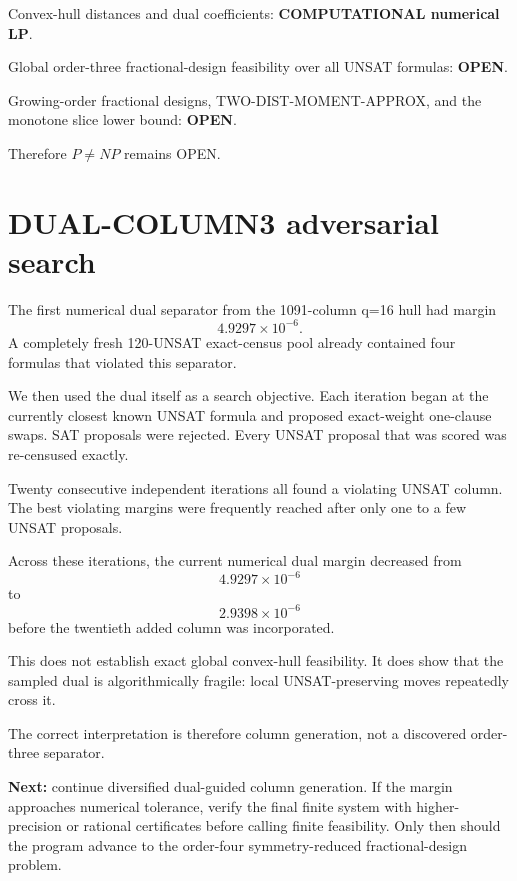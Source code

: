 \documentclass[11pt]{article}
\begin{document}
Convex-hull distances and dual coefficients: \textbf{COMPUTATIONAL numerical
LP}.

Global order-three fractional-design feasibility over all UNSAT formulas:
\textbf{OPEN}.

Growing-order fractional designs, TWO-DIST-MOMENT-APPROX, and the monotone
slice lower bound: \textbf{OPEN}.

Therefore \(P\ne NP\) remains OPEN.


\section{DUAL-COLUMN3 adversarial search}

The first numerical dual separator from the 1091-column q=16 hull had margin
\[
4.9297\times10^{-6}.
\]
A completely fresh 120-UNSAT exact-census pool already contained four formulas
that violated this separator.

We then used the dual itself as a search objective.  Each iteration began at
the currently closest known UNSAT formula and proposed exact-weight one-clause
swaps. SAT proposals were rejected.  Every UNSAT proposal that was scored was
re-censused exactly.

Twenty consecutive independent iterations all found a violating UNSAT column.
The best violating margins were frequently reached after only one to a few
UNSAT proposals.

Across these iterations, the current numerical dual margin decreased from
\[
4.9297\times10^{-6}
\]
to
\[
2.9398\times10^{-6}
\]
before the twentieth added column was incorporated.

This does not establish exact global convex-hull feasibility.  It does show
that the sampled dual is algorithmically fragile: local UNSAT-preserving
moves repeatedly cross it.

The correct interpretation is therefore column generation, not a discovered
order-three separator.

\textbf{Next:} continue diversified dual-guided column generation.  If the
margin approaches numerical tolerance, verify the final finite system with
higher-precision or rational certificates before calling finite feasibility.
Only then should the program advance to the order-four symmetry-reduced
fractional-design problem.
\end{document}
